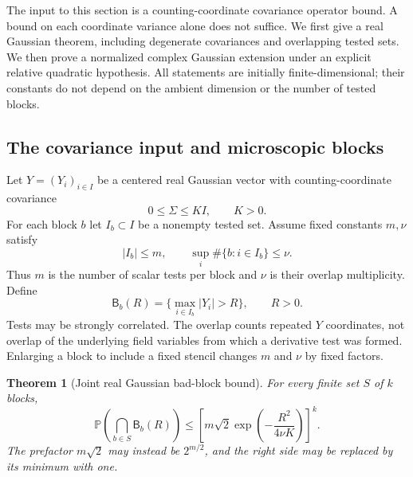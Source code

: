 \documentclass[11pt]{article}
\newtheorem{theorem}{Theorem}[section]
\theoremstyle{remark}
\begin{document}
The input to this section is a counting-coordinate covariance
operator bound. A bound on each coordinate variance alone does
not suffice. We first give a real Gaussian theorem, including
degenerate covariances and overlapping tested sets. We then prove
a normalized complex Gaussian extension under an explicit
relative quadratic hypothesis. All statements are initially
finite-dimensional; their constants do not depend on the ambient
dimension or the number of tested blocks.

\subsection{The covariance input and microscopic blocks}
\label{jt-input}

Let $Y=(Y_i)_{i\in I}$ be a centered real Gaussian vector with
counting-coordinate covariance
\begin{equation}\label{jt-covariance}
 0\le\Sigma\le K I,\qquad K>0.
\end{equation}
For each block $b$ let $I_b\subset I$ be a nonempty tested set.
Assume fixed constants $m,\nu$ satisfy
\begin{equation}\label{jt-incidence}
 |I_b|\le m,\qquad
 \sup_i\#\{b:i\in I_b\}\le\nu.
\end{equation}
Thus $m$ is the number of scalar tests per block and $\nu$ is
their overlap multiplicity. Define
\begin{equation}\label{jt-bad-event}
 \mathsf B_b(R)=\{\max_{i\in I_b}|Y_i|>R\},\qquad R>0.
\end{equation}
Tests may be strongly correlated. The overlap counts repeated
$Y$ coordinates, not overlap of the underlying field variables
from which a derivative test was formed. Enlarging a block to
include a fixed stencil changes $m$ and $\nu$ by fixed factors.

\begin{theorem}[Joint real Gaussian bad-block bound]
\label{jt-real-theorem}
For every finite set $S$ of $k$ blocks,
\begin{equation}\label{jt-real-bound}
 \mathbb P\!\left(\bigcap_{b\in S}\mathsf B_b(R)\right)
 \le\left[
 m\sqrt2\exp\!\left(-\frac{R^2}{4\nu K}\right)
 \right]^k.
\end{equation}
The prefactor $m\sqrt2$ may instead be $2^{m/2}$, and the
right side may be replaced by its minimum with one.
\end{theorem}
\end{document}
